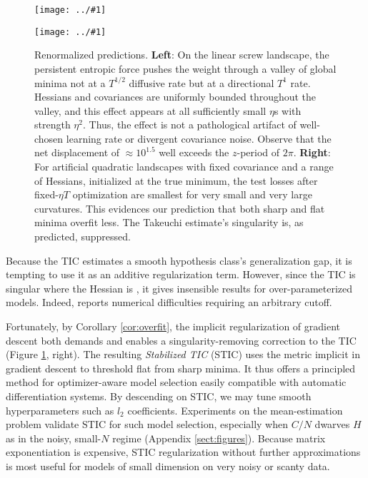 \documentclass{article}
\theoremstyle{plain}
\theoremstyle{definition}
\newcommand{\plotmoo}[3]{
    \texttt{[image: ../\#1]}
}
\begin{document}
        \begin{figure}[h!] 
            \centering
            \plotmoo{plots/thermo-linear-screw}{0.48\columnwidth}{4.0cm}
            \plotmoo{plots/tak}{0.48\columnwidth}{4.0cm}
            \caption{
                Renormalized predictions.
                {\bf Left}: On the linear screw landscape, the persistent
                entropic force pushes the weight through a valley of global
                minima not at a $T^{1/2}$ diffusive rate but at a directional
                $T^1$ rate.  Hessians and covariances  are uniformly bounded
                throughout the valley, and this effect appears at all
                sufficiently small $\eta$s with strength $\eta^2$.  Thus, the
                effect is not a pathological artifact of well-chosen learning
                rate or divergent covariance noise.  Observe that the net
                displacement of $\approx 10^{1.5}$ well exceeds the $z$-period
                of $2\pi$. 
                {\bf Right}: For artificial quadratic landscapes with fixed
                covariance and a range of Hessians, initialized at the true
                minimum, the test losses after fixed-$\eta T$ optimization are
                smallest for very small and very large curvatures.  This
                evidences our prediction that both sharp and flat minima
                overfit less.  The Takeuchi estimate's singularity is, as
                predicted, suppressed.
            }
            \label{fig:thermoandtak}
        \end{figure}

        Because the TIC estimates a smooth hypothesis class's generalization
        gap, it is tempting to use it as an additive regularization term.
        However, since the TIC is singular where the Hessian is , it gives insensible results for over-parameterized
        models.  Indeed, \citet{di18} reports numerical difficulties
        requiring an arbitrary cutoff. 

        Fortunately, by Corollary \ref{cor:overfit}, the implicit
        regularization of gradient descent both demands and enables a
        singularity-removing correction to the TIC (Figure
        \ref{fig:thermoandtak}, right).  The resulting \emph{Stabilized TIC} (STIC) uses the
        metric implicit in gradient descent to threshold flat from sharp
        minima.  It thus offers a principled method for optimizer-aware model
        selection easily compatible with automatic differentiation systems.  By
        descending on STIC, we may tune smooth hyperparameters such as $l_2$
        coefficients.  Experiments on the mean-estimation problem validate STIC
        for such model selection, especially when $C/N$ dwarves $H$ as in the
        noisy, small-$N$ regime (Appendix \ref{sect:figures}).  Because matrix
        exponentiation is expensive, STIC regularization without further
        approximations is most useful for models of small dimension
        on very noisy or scanty data.
\end{document}
